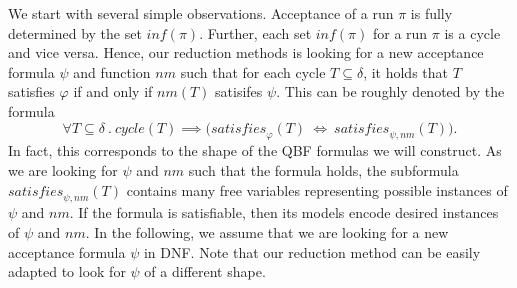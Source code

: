 \documentclass[a4paper,UKenglish,cleveref, autoref, thm-restate]{lipics-v2021}
\newcommand{\minf}{\mathit{inf}}
\newcommand{\rem}{\mathit{nm}}
\newcommand{\mcycle}{\mathit{cycle}}
\newcommand{\msat}{\mathit{satisfies}}
\begin{document}
We start with several simple observations. Acceptance of a run $\pi$
is fully determined by the set $\minf(\pi)$.
Further, each set $\minf(\pi)$ for a run $\pi$ is a cycle and vice
versa. Hence, our reduction methods is looking for a new acceptance
formula $\psi$ and function $\rem$ such that for each cycle
$T\subseteq\delta$, it holds that $T$ satisfies $\varphi$ if and only
if $\rem(T)$ satisifes $\psi$. This can be roughly denoted by the
formula
\[
  \forall T\subseteq\delta~.~\mcycle(T)\implies\big(\msat_\varphi(T) ~\iff~ \msat_{\psi,\rem}(T)\big).
\]
In fact, this corresponds to the shape of the QBF formulas we will
construct. As we are looking for $\psi$ and $\rem$ such that the
formula holds, the subformula $\msat_{\psi,\rem}(T)$ contains many
free variables representing possible instances of $\psi$ and
$\rem$. If the formula is satisfiable, then its models encode desired
instances of $\psi$ and $\rem$.  In the following, we assume that we
are looking for a new acceptance formula $\psi$ in DNF. Note that our
reduction method can be easily adapted to look for $\psi$ of a
different shape.
\end{document}
